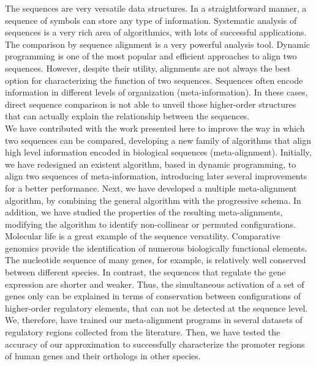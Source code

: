 \begin{small}
The sequences are very versatile data structures. In a straightforward manner,
a sequence of symbols can store any type of information. Systematic analysis
of sequences is a very rich area of algorithmics, with lots of successful
applications. The comparison by sequence alignment is a very powerful analysis 
tool. Dynamic programming is one of the most popular and efficient approaches 
to align two sequences. However, despite their utility, alignments
are not always the best option for characterizing the function of two
sequences. Sequences often encode information in different levels of
organization (meta-information). In these cases, direct sequence comparison
is not able to unveil those higher-order structures that can actually explain
the relationship between the sequences.\\

We have contributed with the work presented here to improve the way in which
two sequences can be compared, developing a new family of algorithms that
align high level information encoded in biological sequences (meta-alignment).
Initially, we have redesigned an existent algorithm, based in dynamic programming,
to align two sequences of meta-information, introducing later several improvements
for a better performance. Next, we have developed a multiple meta-alignment algorithm,
by combining the general algorithm with the progressive schema. In addition,
we have studied the properties of the resulting meta-alignments, modifying the
algorithm to identify non-collinear or permuted configurations.\\

Molecular life is a great example of the sequence versatility. Comparative genomics
provide the identification of numerous biologically functional elements. The
nucleotide sequence of many genes, for example, is relatively well conserved
between different species. In contrast, the sequences that regulate the gene
expression are shorter and weaker. Thus, the simultaneous activation of a set
of genes only can be explained in terms of conservation between configurations
of higher-order regulatory elements, that can not be detected at the sequence level.
We, therefore, have trained our meta-alignment programs in several datasets
of regulatory regions collected from the literature. Then, we have tested the
accuracy of our approximation to successfully characterize the promoter regions
of human genes and their orthologs in other species.\\
\end{small}

